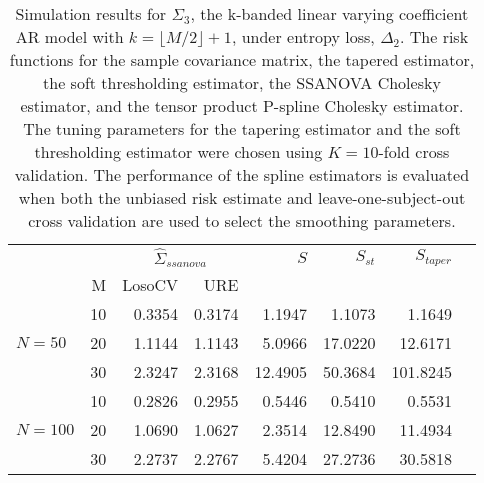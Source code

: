 \documentclass[12pt]{article}
\theoremstyle{definition}
\begin{document}
\begin{table}[ht]
\centering
\caption{Simulation results for $\Sigma_3$, the k-banded linear varying coefficient AR model with $k = \lfloor M/2\rfloor + 1$, under entropy loss, $\Delta_2$. The risk functions for the sample covariance matrix, the tapered estimator, the soft thresholding estimator, the SSANOVA Cholesky estimator, and the tensor product P-spline Cholesky estimator. The tuning parameters for the tapering estimator and the soft thresholding estimator were chosen using $K = 10$-fold cross validation. The performance of the spline estimators is evaluated when both the unbiased risk estimate and leave-one-subject-out cross validation are used to select the smoothing parameters.}
\begin{tabular}{l|r|rrrrrr}
&  & \multicolumn{2}{c}{$\hat{\Sigma}_{ssanova}$} & $S$ & $S_{st}$ & $S_{taper}$ \\ 
&M & \mbox{LosoCV} & \mbox{URE} &  \\  
&    10 & 0.3354 &	0.3174	&  1.1947  & 1.1073 & 1.1649\\ 
$N = 50$ &    20 & 1.1144 &	1.1143	&  5.0966&17.0220 & 12.6171 \\ 
  &    30 & 2.3247 & 	2.3168	&  12.4905 & 50.3684 & 101.8245\\ 
   \hdashline
    &    10 & 0.2826 & 0.2955  & 0.5446& 0.5410 & 0.5531  \\ 
  $N = 100$ &    20 & 1.0690 &  1.0627 & 2.3514 & 12.8490 & 11.4934\\ 
   &    30 & 2.2737 & 2.2767 & 5.4204& 27.2736 & 30.5818  \\ 
\end{tabular}
\end{table}
\end{document}
